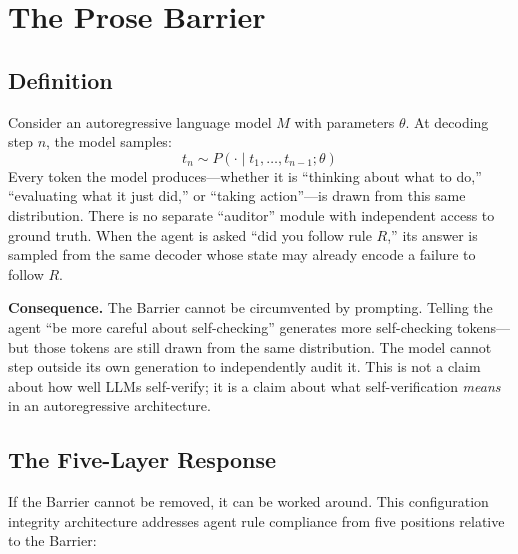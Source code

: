 \documentclass[11pt]{article}
\begin{document}
\section{The Prose Barrier}
\label{sec:barrier}

\subsection{Definition}

Consider an autoregressive language model $M$ with parameters $\theta$. At
decoding step $n$, the model samples:
\[
t_n \sim P(\cdot \mid t_{1}, \ldots, t_{n-1}; \theta)
\]
Every token the model produces---whether it is ``thinking about what to do,''
``evaluating what it just did,'' or ``taking action''---is drawn from this same
distribution. There is no separate ``auditor'' module with independent access to
ground truth. When the agent is asked ``did you follow rule $R$,'' its answer
is sampled from the same decoder whose state may already encode a failure to
follow $R$.

\textbf{Consequence.} The Barrier cannot be circumvented by prompting. Telling the agent
``be more careful about self-checking'' generates more self-checking
tokens---but those tokens are still drawn from the same distribution. The model
cannot step outside its own generation to independently audit it. This is not a
claim about how well LLMs self-verify; it is a claim about what self-verification
\textit{means} in an autoregressive architecture.

\subsection{The Five-Layer Response}

If the Barrier cannot be removed, it can be worked around. This configuration
integrity architecture addresses agent rule compliance from five positions
relative to the Barrier:
\end{document}
